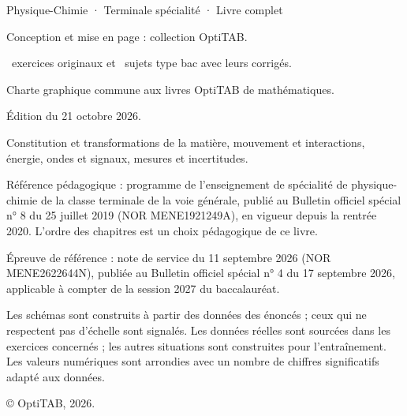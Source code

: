 \thispagestyle{empty}
\vspace*{\fill}
\begin{minipage}{128mm}
\fontsize{9}{13}\selectfont\color{otMuted}
{\otSemi\color{otInk}Physique-Chimie · Terminale spécialité · Livre complet}\par
\vspace{3mm}
Conception et mise en page : collection OptiTAB.\par
\otNbExosTotal\ exercices originaux et \otNbSujetsLettres\ sujets type bac avec leurs corrigés.\par
Charte graphique commune aux livres OptiTAB de mathématiques.\par
\vspace{5mm}
Édition du 21 octobre 2026.\par
Constitution et transformations de la matière, mouvement et interactions,
énergie, ondes et signaux, mesures et incertitudes.\par
\vspace{5mm}
Référence pédagogique : programme de l'enseignement de spécialité de physique-chimie
de la classe terminale de la voie générale, publié au Bulletin officiel spécial n° 8
du 25 juillet 2019 (NOR MENE1921249A), en vigueur depuis la rentrée 2020.
L'ordre des chapitres est un choix pédagogique de ce livre.\par
\vspace{2mm}
Épreuve de référence : note de service du 11 septembre 2026 (NOR MENE2622644N),
publiée au Bulletin officiel spécial n° 4 du 17 septembre 2026, applicable
à compter de la session 2027 du baccalauréat.\par
\vspace{5mm}
Les schémas sont construits à partir des données des énoncés ; ceux qui ne
respectent pas d'échelle sont signalés. Les données réelles sont sourcées dans
les exercices concernés ; les autres situations sont construites pour l'entraînement.
Les valeurs numériques sont arrondies avec un nombre de chiffres significatifs adapté aux données.\par
\vspace{5mm}
© OptiTAB, 2026.\par
\otSite
\end{minipage}
\clearpage

